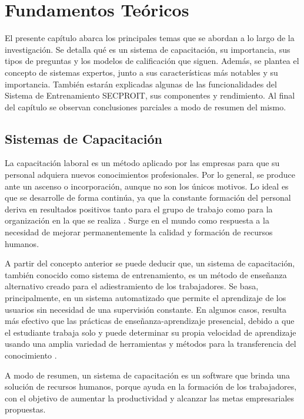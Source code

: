 \chapter{Fundamentos Teóricos}
El presente capítulo abarca los principales temas que se abordan a lo largo de la investigación. Se detalla qué es un sistema de capacitación, su importancia, sus tipos de preguntas y los modelos de calificación que siguen. Además, se plantea el concepto de sistemas expertos, junto a sus características más notables y su importancia. También estarán explicadas algunas de las funcionalidades del Sistema de Entrenamiento SECPROIT, sus componentes y rendimiento.
Al final del capítulo se observan conclusiones parciales a modo de resumen del mismo.

\section{Sistemas de Capacitación}
La capacitación laboral es un método aplicado por las empresas para que su personal adquiera nuevos conocimientos profesionales. Por lo general, se produce ante un ascenso o incorporación, aunque no son los únicos motivos. Lo ideal es que se desarrolle de forma continúa, ya que la constante formación del personal deriva en resultados positivos tanto para el grupo de trabajo como para la organización en la que se realiza \cite{blogBizneo}.
Surge en el mundo como respuesta a la necesidad de mejorar permanentemente la calidad y formación de recursos humanos.

A partir del concepto anterior se puede deducir que, un sistema de capacitación, también conocido como sistema de entrenamiento, es un método de enseñanza alternativo creado para el adiestramiento de los trabajadores. Se basa, principalmente, en un sistema automatizado que permite el aprendizaje de los usuarios sin necesidad de una supervisión constante. En algunos casos, resulta más efectivo que las prácticas de enseñanza-aprendizaje presencial, debido a que el estudiante trabaja solo y puede determinar su propia velocidad de aprendizaje usando una amplia variedad de herramientas y métodos para la transferencia del conocimiento \cite{seguridadMinera}.

A modo de resumen, un sistema de capacitación es un software que brinda una solución de recursos humanos, porque ayuda en la formación de los trabajadores, con el objetivo de aumentar la productividad y alcanzar las metas empresariales propuestas.

